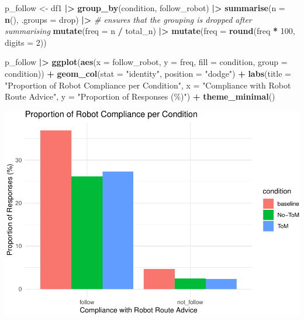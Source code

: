 \documentclass[
]{article}
\newenvironment{Shaded}{\begin{snugshade}}{\end{snugshade}}
\newcommand{\AttributeTok}[1]{\textcolor[rgb]{0.13,0.29,0.53}{#1}}
\newcommand{\CommentTok}[1]{\textcolor[rgb]{0.56,0.35,0.01}{\textit{#1}}}
\newcommand{\DecValTok}[1]{\textcolor[rgb]{0.00,0.00,0.81}{#1}}
\newcommand{\FunctionTok}[1]{\textcolor[rgb]{0.13,0.29,0.53}{\textbf{#1}}}
\newcommand{\NormalTok}[1]{#1}
\newcommand{\OtherTok}[1]{\textcolor[rgb]{0.56,0.35,0.01}{#1}}
\newcommand{\SpecialCharTok}[1]{\textcolor[rgb]{0.81,0.36,0.00}{\textbf{#1}}}
\newcommand{\StringTok}[1]{\textcolor[rgb]{0.31,0.60,0.02}{#1}}
\begin{document}
\begin{Shaded}
\begin{Highlighting}[]
\NormalTok{p\_follow }\OtherTok{\textless{}{-}}
\NormalTok{  df1 }\SpecialCharTok{|\textgreater{}}
  \FunctionTok{group\_by}\NormalTok{(condition, follow\_robot) }\SpecialCharTok{|\textgreater{}}
  \FunctionTok{summarise}\NormalTok{(}\AttributeTok{n =} \FunctionTok{n}\NormalTok{(), }
            \AttributeTok{.groups =} \StringTok{\textquotesingle{}drop\textquotesingle{}}\NormalTok{) }\SpecialCharTok{|\textgreater{}} \CommentTok{\# ensures that the grouping is dropped after summarising}
  \FunctionTok{mutate}\NormalTok{(}\AttributeTok{freq =}\NormalTok{ n }\SpecialCharTok{/}\NormalTok{ total\_n) }\SpecialCharTok{|\textgreater{}}
  \FunctionTok{mutate}\NormalTok{(}\AttributeTok{freq =} \FunctionTok{round}\NormalTok{(freq }\SpecialCharTok{*} \DecValTok{100}\NormalTok{, }\AttributeTok{digits =} \DecValTok{2}\NormalTok{))}

\NormalTok{p\_follow }\SpecialCharTok{|\textgreater{}}  
  \FunctionTok{ggplot}\NormalTok{(}\FunctionTok{aes}\NormalTok{(}\AttributeTok{x =}\NormalTok{ follow\_robot,}
                \AttributeTok{y =}\NormalTok{ freq,}
                \AttributeTok{fill =}\NormalTok{ condition,}
                \AttributeTok{group =}\NormalTok{ condition)) }\SpecialCharTok{+} 
  \FunctionTok{geom\_col}\NormalTok{(}\AttributeTok{stat =} \StringTok{"identity"}\NormalTok{,}
           \AttributeTok{position =} \StringTok{"dodge"}\NormalTok{) }\SpecialCharTok{+}
  \FunctionTok{labs}\NormalTok{(}\AttributeTok{title =} \StringTok{"Proportion of Robot Compliance per Condition"}\NormalTok{,}
       \AttributeTok{x =} \StringTok{"Compliance with Robot Route Advice"}\NormalTok{,}
       \AttributeTok{y =} \StringTok{"Proportion of Responses (\%)"}\NormalTok{) }\SpecialCharTok{+}
  \FunctionTok{theme\_minimal}\NormalTok{()}
\end{Highlighting}
\end{Shaded}

\includegraphics{T5_Data_wrangling_pdf_files/figure-latex/unnamed-chunk-20-1.pdf}
\end{document}
